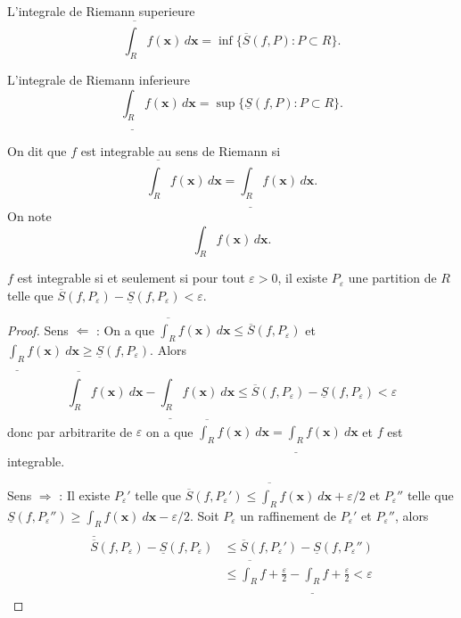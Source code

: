 \begin{definition}
L'integrale de Riemann superieure 
$$\overline{\int _{R}} f(\boldsymbol{x})\,d\boldsymbol{x}=\inf\{ \overline{S}(f,P):P\subset R \}.$$
\end{definition}
\begin{definition}
L'integrale de Riemann inferieure
$$
\underline{\int _{R}} f(\boldsymbol{x})\, d\boldsymbol{x}=\sup \{ \underline{S}(f,P):P\subset R \}.
$$
\end{definition}

\begin{definition}
On dit que $f$ est integrable au sens de Riemann si 
$$
\overline{\int _{R}} f(\boldsymbol{x})\,d\boldsymbol{x}=\underline{\int _{R}}f(\boldsymbol{x})\,d\boldsymbol{x}.
$$
On note 
$$
\int _{R}f(\boldsymbol{x})\, d\boldsymbol{x}.
$$
\end{definition}
\begin{lemma}
$f$ est integrable si et seulement si pour tout $\varepsilon>0$, il existe $P_{\varepsilon}$ une partition de $R$ telle que $\overline{S}(f,P_{\varepsilon})-\underline{S}(f,P_{\varepsilon})<\varepsilon$.
\end{lemma}
\begin{proof}
Sens $\Leftarrow$ : On a que $\overline{\int _{R}}f(\boldsymbol{x})~d\boldsymbol{x}\le \overline{S}(f,P_{\varepsilon})$ et $\underline{\int _{R}}f(\boldsymbol{x})~d\boldsymbol{x}\ge \underline{S}(f,P_{\varepsilon})$. Alors 
$$
\overline{\int _{R}}f(\boldsymbol{x})~d\boldsymbol{x}-\underline{\int _{R}}f(\boldsymbol{x})~d\boldsymbol{x}\le \overline{S}(f,P_{\varepsilon})-\underline{S}(f,P_{\varepsilon})<\varepsilon
$$
donc par arbitrarite de $\varepsilon$ on a que $\overline{\int _{R}}f(\boldsymbol{x})~d\boldsymbol{x}=\underline{\int _{R}}f(\boldsymbol{x})~d\boldsymbol{x}$ et $f$ est integrable.

Sens $\Rightarrow$ : Il existe $P_{\varepsilon}'$ telle que $\overline{S}(f,P_{\varepsilon}')\le \overline{\int _{R}}f(\boldsymbol{x})~d\boldsymbol{x}+\varepsilon /2$ et $P_{\varepsilon}''$ telle que $\underline{S}(f,P_{\varepsilon}'')\ge \underline{\int _{R}}f(\boldsymbol{x})~d\boldsymbol{x}-\varepsilon /2$. Soit $P_{\varepsilon}$ un raffinement de $P_{\varepsilon}'$ et $P_{\varepsilon}''$, alors
\begin{align*}
\overline{S}(f,P_{\varepsilon})-\underline{S}(f,P_{\varepsilon}) & \le \overline{S}(f,P_{\varepsilon}')-\underline{S}(f,P_{\varepsilon}'') \\
 & \le \overline{\int _{R}}f+\frac{\varepsilon}{2}-\underline{\int _{R}}f+\frac{\varepsilon}{2}<\varepsilon
\end{align*}
\end{proof}

